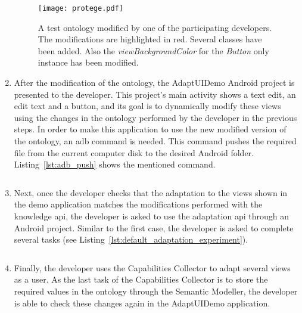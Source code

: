 \begin{enumerate}
  \begin{figure}
  \centering
  \texttt{[image: protege.pdf]}
  \caption{A test ontology modified by one of the participating developers. 
  The modifications are highlighted in red. Several classes have been added. 
  Also the \textit{viewBackgroundColor} for the \textit{Button} only instance 
  has been modified.}
  \label{fig:protege}
  \end{figure}
  
  \item After the modification of the ontology, the AdaptUIDemo Android project 
  is presented to the developer. This project's main activity shows a text edit, 
  an edit text and a button, and its goal is to dynamically modify these views 
  using the changes in the ontology performed by the developer in the previous
  steps. In order to make this application to use the new modified version of 
  the ontology, an \ac{adb} command is needed. This command pushes the required 
  file from the current computer disk to the desired Android folder. 
  Listing~\ref{lst:adb_push} shows the mentioned command.
  
  \inputminted[linenos=true, fontsize=\footnotesize, frame=lines]{java}{5_experiments_and_results/adb_push.java}
  
  \item Next, once the developer checks that the adaptation to the views shown
  in the demo application matches the modifications performed with the knowledge 
  \ac{api}, the developer is asked to use the adaptation \ac{api} through an
  Android project. Similar to the first case, the developer is asked to complete
  several tasks (see Listing~\ref{lst:default_adaptation_experiment}).

  \inputminted[linenos=true, fontsize=\footnotesize, frame=lines]{java}{5_experiments_and_results/default_adaptation_experiment.java}
  
  \item Finally, the developer uses the Capabilities Collector to adapt several
  views as a user. As the last task of the Capabilities Collector is to store the
  required values in the ontology through the Semantic Modeller, the developer 
  is able to check these changes again in the AdaptUIDemo application.
  
\end{enumerate}



